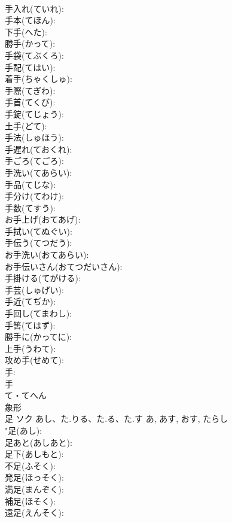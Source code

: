 \documentclass[8pt]{extreport}
\begin{document}
\begin{CJK}{UTF8}{min}
\\	手入れ(ていれ): 
\\	手本(てほん): 
\\	下手(へた): 
\\	勝手(かって): 
\\	手袋(てぶくろ): 
\\	手配(てはい): 
\\	着手(ちゃくしゅ): 
\\	手際(てぎわ): 
\\	手首(てくび): 
\\	手錠(てじょう): 
\\	土手(どて): 
\\	手法(しゅほう): 
\\	手遅れ(ておくれ): 
\\	手ごろ(てごろ): 
\\	手洗い(てあらい): 
\\	手品(てじな): 
\\	手分け(てわけ): 
\\	手数(てすう): 
\\	お手上げ(おてあげ): 
\\	手拭い(てぬぐい): 
\\	手伝う(てつだう): 
\\	お手洗い(おてあらい): 
\\	お手伝いさん(おてつだいさん): 
\\	手掛ける(てがける): 
\\	手芸(しゅげい): 
\\	手近(てぢか): 
\\	手回し(てまわし): 
\\	手筈(てはず): 
\\	勝手に(かってに): 
\\	上手(うわて): 
\\	攻め手(せめて): 
\\	手: 
\\	手	
\\	て・てへん	
\\	象形 
\\	足	ソク	あし、た.りる、た.る、た.す	あ, あす, おす, たらし	
\\	"足(あし): 
\\	足あと(あしあと): 
\\	足下(あしもと): 
\\	不足(ふそく): 
\\	発足(ほっそく): 
\\	満足(まんぞく): 
\\	補足(ほそく): 
\\	遠足(えんそく): 

\end{CJK}
\end{document}
